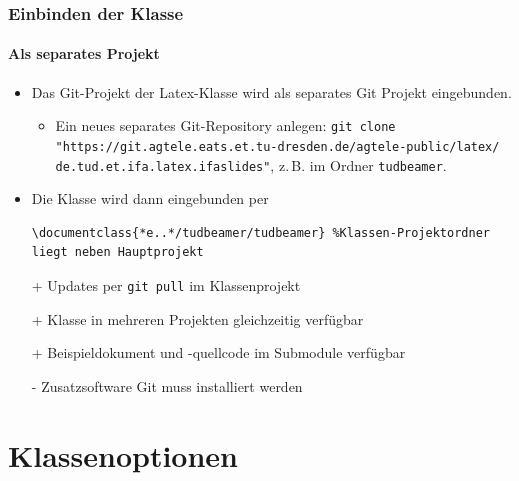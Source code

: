 \documentclass[german,notoc,draft]{tudbeamer}%
\begin{document}
\begin{frame}[fragile]
	\frametitle{Einbinden der Klasse}
	\framesubtitle{Als separates Projekt}

	\begin{itemize}
		\item Das Git-Projekt der Latex-Klasse wird als separates Git Projekt eingebunden.
		\begin{itemize}
			\item Ein neues separates Git-Repository anlegen: 
				\texttt{git clone "https://git.agtele.eats.et.tu-dresden.de/agtele-public/latex/ de.tud.et.ifa.latex.ifaslides"}, z.\,B. im Ordner \texttt{tudbeamer}.
		\end{itemize}
		\item Die Klasse wird dann eingebunden per
			\begin{lstlisting}[gobble=8,style=latex,numbers=none]
				\documentclass{*e..*/tudbeamer/tudbeamer} %Klassen-Projektordner liegt neben Hauptprojekt
			\end{lstlisting}
	\end{itemize}	
	\begin{itemize}
		\item[+] Updates per \texttt{git pull} im Klassenprojekt
		\item[+] Klasse in mehreren Projekten gleichzeitig verfügbar
		\item[+] Beispieldokument und -quellcode im Submodule verfügbar
		\item[-] Zusatzsoftware Git muss installiert werden
	\end{itemize}
\end{frame}

\section{Klassenoptionen}
\end{document}
